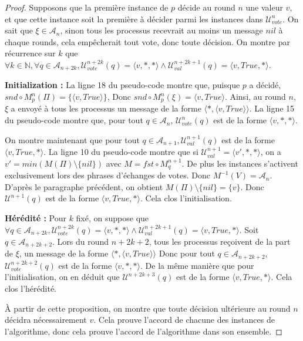 \documentclass{article}
\begin{document}
\begin{proof}
	Supposons que la première instance de $p$ décide au round $n$ une valeur $v$, et que cette instance soit la première à décider parmi les instances dans $\mathcal{U}^n_{vote}$.
	On sait que $\xi \in \mathcal{A}_n$, sinon tous les processus recevrait au moins un message $nil$ à chaque rounds, cela empêcherait tout vote, donc toute décision.
	On montre par récurrence sur $k$ que
	$\forall k \in \mathds{N}, \forall q \in \mathcal{A}_{n+2k},
	\mathcal{U}_{vote}^{n+2k }(q) = \langle v, *, * \rangle \wedge
	\mathcal{U}_{val}^{n+2k+1}(q) = \langle v, True, * \rangle$.

	\textbf{Initialization :} La ligne 18 du pseudo-code montre que, puisque $p$ a décidé, $snd \circ M^n_p(\Pi) = \{\langle v, True \rangle\}$, Donc $snd \circ M^n_p(\xi) = \langle v, True \rangle$.
		Ainsi, au round $n$, $\xi$ a envoyé à tous les processus un message de la forme $\langle *, \langle v, True \rangle \rangle$.
		La ligne 15 du pseudo-code montre que, pour tout $q \in \mathcal{A}_n$, $\mathcal{U}_{vote}^n(q)$ est de la forme $\langle v, *, * \rangle$.

		On montre maintenant que pour tout $q \in \mathcal{A}_{n+1}, \mathcal{U}^{n+1}_{val}(q)$ est de la forme $\langle v, True, * \rangle$.
		La ligne 10 du pseudo-code montre que si $\mathcal{U}^{n+1}_{val} = \langle v', *, * \rangle$, on a $v' = min(M(\Pi) \setminus \{nil\})$ avec $M = fst \circ M_q^{n+1}$.
		De plus les instances s'activent exclusivement lors des phrases d'échanges de votes. Donc $M^{-1}(V) = \mathcal{A}_{n}$.
		D'après le paragraphe précédent, on obtient $M(\Pi) \setminus \{nil\} = \{v\}$. Donc $\mathcal{U}^{n+1}(q)$ est de la forme $\langle v, True, * \rangle$.
		Cela clos l'initialisation.

	\textbf{Hérédité :} Pour $k$ fixé, on suppose que $\forall q \in \mathcal{A}_{n+2k},
		\mathcal{U}_{vote}^{n+2k }(q) = \langle v, *, * \rangle \wedge
		\mathcal{U}_{val}^{n+2k+1}(q) = \langle v, True, * \rangle$.
		Soit $q \in \mathcal{A}_{n+2k+2}$.
		Lors du round $n+2k+2$, tous les processus reçoivent de la part de $\xi$, un message de la forme $\langle *, \langle v, True \rangle \rangle$
		Donc pour tout $q \in \mathcal{A}_{n+2k+2}$, $\mathcal{U}_{vote}^{n+2k+2}(q)$ est de la forme $\langle v, *, * \rangle$.
		De la même manière que pour l'initialisation, on en déduit que $\mathcal{U}^{n+2k+3}(q)$ est de la forme $\langle v, True, * \rangle$.
		Cela clos l'hérédité.

	À partir de cette proposition, on montre que toute décision ultérieure au round $n$ décidra nécessairement $v$. Cela prouve l'accord de chacune des instances de l'algorithme,
	donc cela prouve l'accord de l'algorithme dans son ensemble.
\end{proof}
\end{document}
